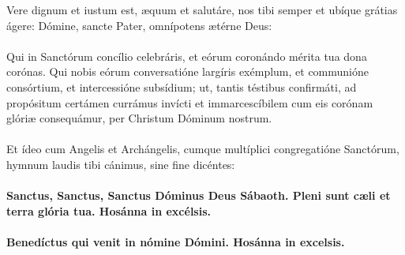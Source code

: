 \documentclass[12pt, a4paper]{article}
\begin{document}
	\\
	\\
	\\
	\\
	\\
	Vere dignum et iustum est, æquum
	et salutáre, nos tibi semper et
	ubíque grátias ágere: Dómine,
	sancte Pater, omnípotens ætérne
	Deus:
	\\\\
	Qui in Sanctórum concílio celebráris,
	et eórum coronándo mérita tua dona corónas.
	Qui nobis eórum conversatióne largíris exémplum,
	et communióne consórtium, et intercessióne subsídium;
	ut, tantis téstibus confirmáti,
	ad propósitum certámen currámus invícti
	et immarcescíbilem cum eis corónam glóriæ consequámur,
	per Christum Dóminum nostrum.
	\\\\
	Et ídeo cum Angelis et Archángelis,
	cumque multíplici congregatióne Sanctórum,
	hymnum laudis tibi cánimus, sine fine dicéntes: 
	\\\\
	\textbf{Sanctus, Sanctus, Sanctus Dóminus
		Deus Sábaoth. Pleni sunt cæli et
		terra glória tua. Hosánna in
		excélsis.}
	\\\\
	\textbf{Benedíctus qui venit in nómine
		Dómini. Hosánna in excelsis.}
	
	\newpage
	
\end{document}
